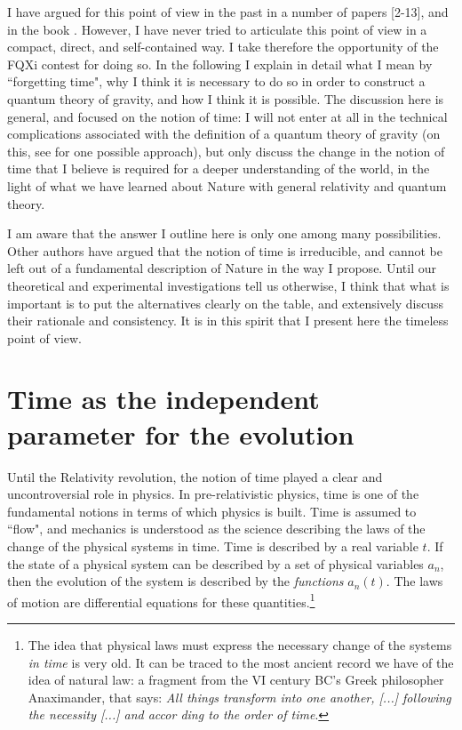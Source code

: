 \documentclass[10pt,nofootinbib]{revtex4}
\begin{document}
I have argued for this point of view in the past in a number of papers [2-13], and in the book \cite{book}.  However, I have never tried to articulate this point of view in a compact, direct, and self-contained way.  I take therefore the opportunity of the FQXi contest for doing so.  In the following I explain in detail what I mean by ``forgetting time", why I think it is necessary to do so in order to construct a quantum theory of gravity, and how I think it is possible.  The discussion here is general, and focused on the notion of time: I will not enter at all in the technical complications associated with the definition of a quantum theory of gravity (on this, see  \cite{book,loop} for one possible approach), but only discuss the change in the notion of time that I believe is required for a deeper understanding of the world, in the light of what we have learned about Nature with general relativity and quantum theory. 

I am aware that the answer I outline here is only one among many possibilities. Other authors have argued that the notion of time is irreducible, and cannot be left out of a fundamental description of Nature in the way I propose.  Until our theoretical and experimental investigations tell us otherwise, I think that what is important is to put the alternatives clearly on the table, and extensively discuss their rationale and consistency. It is in this spirit that I present here the timeless point of view. 

\section{Time as the independent parameter for the evolution}

Until the Relativity revolution, the notion of time played a clear and uncontroversial role in physics. In pre-relativistic physics, time is one of the fundamental notions in terms of which physics is built.  Time is assumed to ``flow", and mechanics is understood as the science describing the laws of the change of the physical systems in time.  Time is described by a real variable $t$.  If the state of a physical system can be described by a set of physical variables $a_n$, then the evolution of the system is described by the {\em functions} $a_n(t)$.  The laws of motion are differential equations for these quantities.\footnote{The idea that physical laws must express the necessary change of the systems \emph{in time} is very old. It can be traced to the most ancient record we have of the idea of natural law: a fragment from the VI century BC's Greek philosopher Anaximander, that says: {\em All things transform into one another, [...]  following the necessity [...] and accor
 ding to the order of time}. }
\end{document}
